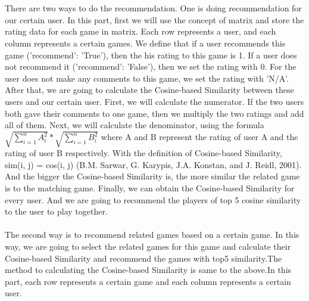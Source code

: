 \documentclass[fontsize=11pt]{article}
\begin{document}
    \\
    \\There are two ways to do the recommendation. One is doing recommendation for our certain user. In this part, first we will use the concept of matrix and store the rating data for each game in matrix. Each row represents a user, and each column represents a certain games. We define that if a user recommends this game ('recommend': 'True'), then the his rating to this game is 1. If a user does not recommend it ('recommend': 'False'), then we set the rating with 0. For the user does not make any comments to this game, we set the rating with 'N/A'. After that, we are going to calculate the Cosine-based Similarity between these users and our certain user. First, we will calculate the numerator. If the two users both gave their comments to one game, then we multiply the two ratings and add all of them. Next, we will calculate the denominator, using the formula $\sqrt{\sum_{i = 1}^{n}A_{i}^2} * \sqrt{\sum_{i = 1}^{n}B_{i}^2}$ where A and B represent the rating of user A and the rating of user B respectively. With the definition of Cosine-based Similarity, sim(i, j) = cos(i, j) (B.M. Sarwar, G. Karypis, J.A. Konstan, and J. Reidl, 2001). And the bigger the Cosine-based Similarity is, the more similar the related game is to the matching game. Finally, we can obtain the Cosine-based Similarity for every user. And we are going to recommend the players of top 5 cosine similarity to the user to play together.
    \\
    \\The second way is to recommend related games based on a certain game. In this way, we are going to select the related games for this game and calculate their Cosine-based Similarity and recommend the games with top5 similarity.The method to calculating the Cosine-based Similarity is same to the above.In this part, each row represents a certain game and each column represents a certain user. 
    \\
\end{document}
